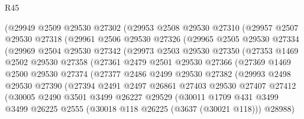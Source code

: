 \begin{lexlean}{R45}
\begin{coremodule}
          (@29949
            @2509
            @29530
            @27302
            (@29953
              @2508
              @29530
              @27310
              (@29957
                @2507
                @29530
                @27318
                (@29961
                  @2506
                  @29530
                  @27326
                  (@29965
                    @2505
                    @29530
                    @27334
                    (@29969
                      @2504
                      @29530
                      @27342
                      (@29973
                        @2503
                        @29530
                        @27350
                        (@27353
                          @1469
                          @2502
                          @29530
                          @27358
                          (@27361
                            @2479
                            @2501
                            @29530
                            @27366
                            (@27369
                              @1469
                              @2500
                              @29530
                              @27374
                              (@27377
                                @2486
                                @2499
                                @29530
                                @27382
                                (@29993
                                  @2498
                                  @29530
                                  @27390
                                  (@27394
                                    @2491
                                    @2497
                                    @26861
                                    @27403
                                    @29530
                                    @27407
                                    @27412
                                    (@30005
                                      @2490
                                      @3501
                                      @3499
                                      @26227
                                      @29529
                                      (@30011
                                        @1709
                                        @431
                                        @3499
                                        @3499
                                        @26225
                                        @2555
                                        (@30018 @118 @26225 (@3637 (@30021 @118)))
                                        @28988)

\end{coremodule}
\end{lexlean}

